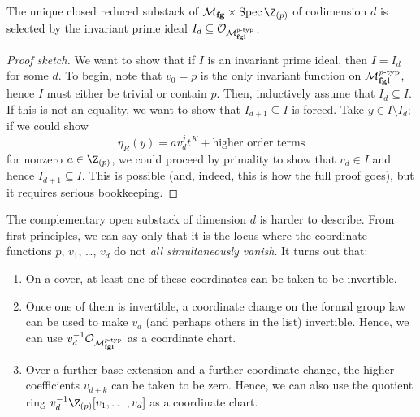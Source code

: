 \begin{theorem}\label{LandwebersClassificationOfClosedSubstacks}
The unique closed reduced substack of \(\moduli{fg} \times \Spec \Z_{(p)}\) of codimension \(d\) is selected by the invariant prime ideal \(I_d \subseteq \mathcal{O}_{\mathcal{M}_{\mathbf{fgl}}^{\mathit{p}\text{-}\mathrm{typ}}}\).
\end{theorem}
\begin{proof}[Proof sketch]
We want to show that if \(I\) is an invariant prime ideal, then \(I = I_d\) for some \(d\).  To begin, note that \(v_0 = p\) is the only invariant function on \(\mathcal{M}_{\mathbf{fgl}}^{\mathit{p}\text{-}\mathrm{typ}}\), hence \(I\) must either be trivial or contain \(p\).  Then, inductively assume that \(I_d \subseteq I\).  If this is not an equality, we want to show that \(I_{d+1} \subseteq I\) is forced.  Take \(y \in I \setminus I_d\); if we could show \[\eta_R(y) = a v_d^j t^K + \text{higher order terms}\] for nonzero \(a \in \Z_{(p)}\), we could proceed by primality to show that \(v_d \in I\) and hence \(I_{d+1} \subseteq I\).  This is possible (and, indeed, this is how the full proof goes), but it requires serious bookkeeping.
\end{proof}

\begin{remark}\label{OpenSubstacksOfMfg}
The complementary open substack of dimension \(d\) is harder to describe. %
From first principles, we can say only that it is the locus where the coordinate functions \(p\), \(v_1\), \ldots, \(v_d\) do not \emph{all simultaneously vanish}.  It turns out that:
\begin{enumerate}
\item On a cover, at least one of these coordinates can be taken to be invertible.\item Once one of them is invertible, a coordinate change on the formal group law can be used to make \(v_d\) (and perhaps others in the list) invertible.  Hence, we can use \(v_d^{-1} \mathcal{O}_{\mathcal{M}_{\mathbf{fgl}}^{\mathit{p}\text{-}\mathrm{typ}}}\) as a coordinate chart.
\item Over a further base extension and a further coordinate change, the higher coefficients \(v_{d+k}\) can be taken to be zero.  Hence, we can also use the quotient ring \(v_d^{-1} \Z_{(p)}[v_1, \ldots, v_d]\) as a coordinate chart.
\end{enumerate}
\end{remark}

